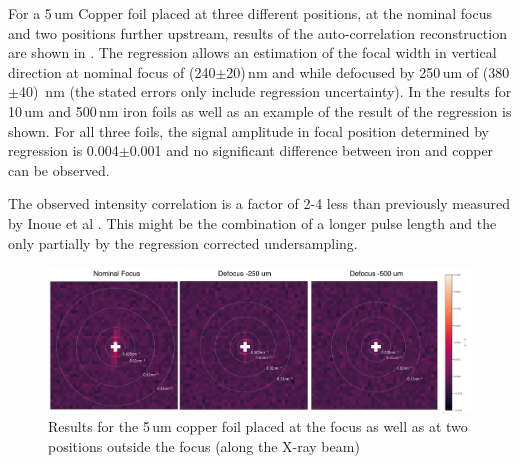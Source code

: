 For a 5\,um Copper foil placed at three different positions, at the nominal focus and two positions further upstream, results of the auto-correlation reconstruction are shown in .
The regression allows an estimation of the focal width in vertical direction at nominal focus of (240$\pm$20)\,nm and while defocused by 250\,um of (380$\pm$40)\, nm (the stated errors only include regression uncertainty).
In  the results for 10\,um and 500\,nm iron foils as well as an example of the result of the regression is shown.
For all three foils, the signal amplitude in focal position determined by regression is 0.004$\pm$0.001 and no significant difference between iron and copper can be observed. 

The observed intensity correlation is a factor of 2-4 less than previously measured by Inoue et al \cite{inoue2019}. This might be the combination of a longer pulse length and the only partially by the regression corrected undersampling. 

\begin{figure}
	\centering
	\includegraphics[width=0.8\linewidth]{images/Cu5um_reco2d.pdf}
	\caption{Results for the 5\,um copper foil placed at the focus as well as at two positions outside the focus (along the X-ray beam) }
	\label{fig:Cu5umreco2d}
\end{figure}

